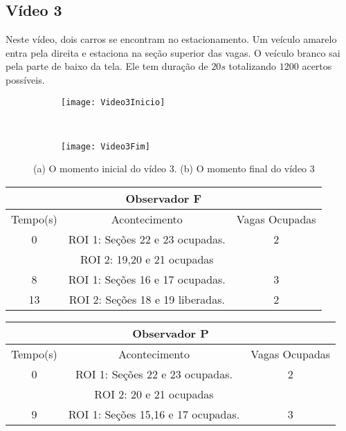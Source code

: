 \subsection{Vídeo 3}

Neste vídeo, dois carros se encontram no estacionamento. Um veículo amarelo entra pela direita e estaciona na seção superior das vagas. O veículo branco sai pela parte de baixo da tela. Ele tem duração de $20s$ totalizando $1200$ acertos possíveis.

\begin{figure}[!h]
\centering
\begin{subfigure}{.5\textwidth}
\centering
\texttt{[image: Video3Inicio]}
\caption{}
\end{subfigure}\
\begin{subfigure}{.5\textwidth}
\centering
\texttt{[image: Video3Fim]}
\caption{}
\end{subfigure}
\centering
\caption{(a) O momento inicial do vídeo 3. (b) O momento final do vídeo 3}%
\label{}%
\end{figure}

\begin{center}
\begin{tabular}{|c||c||c|}
\hline
\multicolumn{3}{|c|}{Observador F}  \\ \hline \hline
Tempo(s) & Acontecimento & Vagas Ocupadas\\ \hline
0 & ROI 1: Seções 22 e 23 ocupadas. & 2 \\
 & ROI 2: 19,20 e 21 ocupadas & \\ \hline
8 & ROI 1: Seções 16 e 17 ocupadas. & 3\\ \hline
13 & ROI 2: Seções 18 e 19 liberadas. & 2\\
\hline
\end{tabular}
\end{center}

\begin{center}
\begin{tabular}{|c||c||c|}
\hline
\multicolumn{3}{|c|}{Observador P}  \\ \hline \hline
Tempo(s) & Acontecimento & Vagas Ocupadas\\ \hline
0 & ROI 1: Seções 22 e 23 ocupadas. & 2 \\
 & ROI 2: 20 e 21 ocupadas &  \\ \hline
9 & ROI 1: Seções 15,16 e 17 ocupadas. & 3 \\
\hline
\end{tabular}
\end{center}

